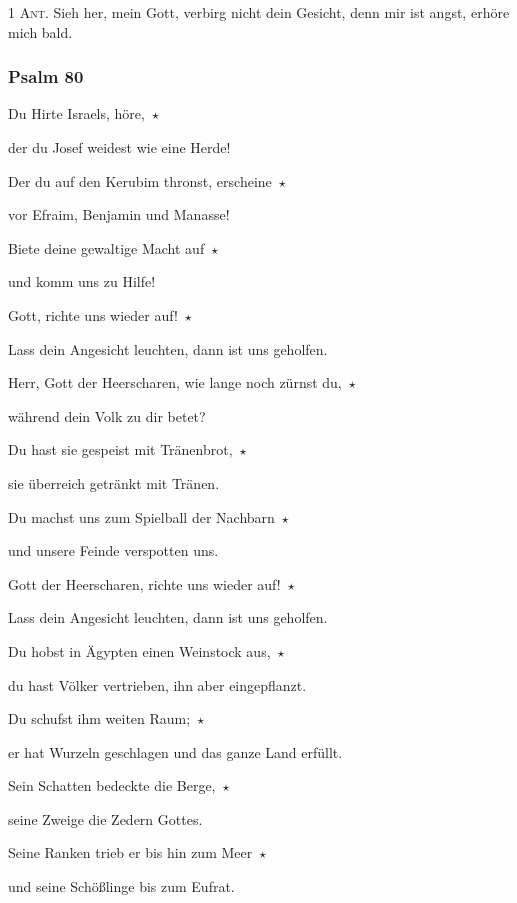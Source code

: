 \noindent \textsc{1 Ant.} Sieh her, mein Gott, verbirg nicht dein Gesicht, denn mir ist angst, erhöre mich bald.

\subsubsection{Psalm 80}

\noindent Du Hirte Israels, höre,~$\star$~\nopagebreak

der du Josef weidest wie eine Herde!

\noindent Der du auf den Kerubim thronst, erscheine~$\star$~\nopagebreak

vor Efraim, Benjamin und Manasse!

\noindent Biete deine gewaltige Macht auf~$\star$~\nopagebreak

und komm uns zu Hilfe!

\noindent Gott, richte uns wieder auf!~$\star$~\nopagebreak

Lass dein Angesicht leuchten, dann ist uns geholfen.

\noindent Herr, Gott der Heerscharen, wie lange noch zürnst du,~$\star$~\nopagebreak

während dein Volk zu dir betet?

\noindent Du hast sie gespeist mit Tränenbrot,~$\star$~\nopagebreak

sie überreich getränkt mit Tränen.

\noindent Du machst uns zum Spielball der Nachbarn~$\star$~\nopagebreak

und unsere Feinde verspotten uns.

\noindent Gott der Heerscharen, richte uns wieder auf!~$\star$~\nopagebreak

Lass dein Angesicht leuchten, dann ist uns geholfen.

\noindent Du hobst in Ägypten einen Weinstock aus,~$\star$~\nopagebreak

du hast Völker vertrieben, ihn aber eingepflanzt.

\noindent Du schufst ihm weiten Raum;~$\star$~\nopagebreak

er hat Wurzeln geschlagen und das ganze Land erfüllt.

\noindent Sein Schatten bedeckte die Berge,~$\star$~\nopagebreak

seine Zweige die Zedern Gottes.

\noindent Seine Ranken trieb er bis hin zum Meer~$\star$~\nopagebreak

und seine Schößlinge bis zum Eufrat.

